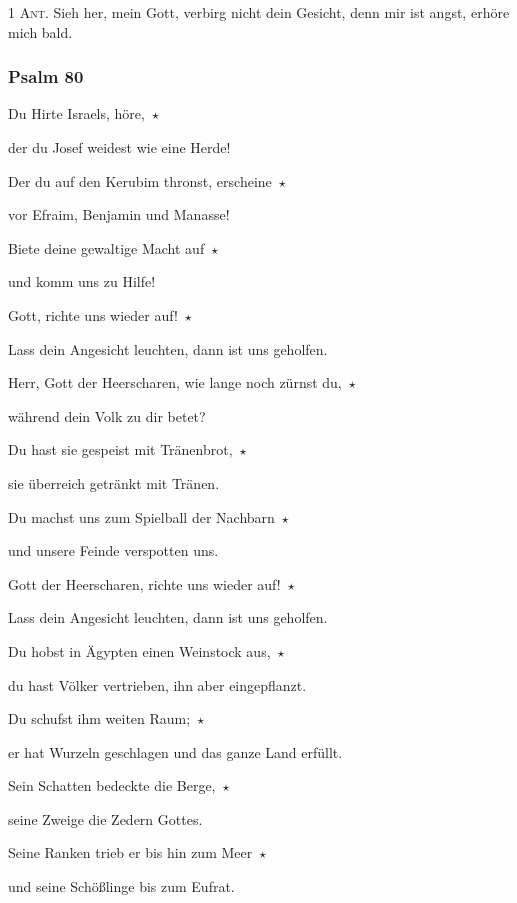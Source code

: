 \noindent \textsc{1 Ant.} Sieh her, mein Gott, verbirg nicht dein Gesicht, denn mir ist angst, erhöre mich bald.

\subsubsection{Psalm 80}

\noindent Du Hirte Israels, höre,~$\star$~\nopagebreak

der du Josef weidest wie eine Herde!

\noindent Der du auf den Kerubim thronst, erscheine~$\star$~\nopagebreak

vor Efraim, Benjamin und Manasse!

\noindent Biete deine gewaltige Macht auf~$\star$~\nopagebreak

und komm uns zu Hilfe!

\noindent Gott, richte uns wieder auf!~$\star$~\nopagebreak

Lass dein Angesicht leuchten, dann ist uns geholfen.

\noindent Herr, Gott der Heerscharen, wie lange noch zürnst du,~$\star$~\nopagebreak

während dein Volk zu dir betet?

\noindent Du hast sie gespeist mit Tränenbrot,~$\star$~\nopagebreak

sie überreich getränkt mit Tränen.

\noindent Du machst uns zum Spielball der Nachbarn~$\star$~\nopagebreak

und unsere Feinde verspotten uns.

\noindent Gott der Heerscharen, richte uns wieder auf!~$\star$~\nopagebreak

Lass dein Angesicht leuchten, dann ist uns geholfen.

\noindent Du hobst in Ägypten einen Weinstock aus,~$\star$~\nopagebreak

du hast Völker vertrieben, ihn aber eingepflanzt.

\noindent Du schufst ihm weiten Raum;~$\star$~\nopagebreak

er hat Wurzeln geschlagen und das ganze Land erfüllt.

\noindent Sein Schatten bedeckte die Berge,~$\star$~\nopagebreak

seine Zweige die Zedern Gottes.

\noindent Seine Ranken trieb er bis hin zum Meer~$\star$~\nopagebreak

und seine Schößlinge bis zum Eufrat.

